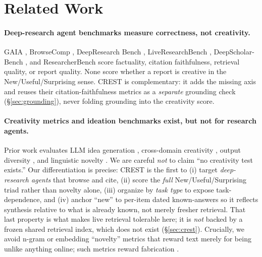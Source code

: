\section{Related Work}
\label{sec:related}

\paragraph{Deep-research agent benchmarks measure correctness, not creativity.}
GAIA \citep{mialon2023gaia}, BrowseComp \citep{wei2025browsecomp}, DeepResearch Bench
\citep{du2025deepresearchbench}, LiveResearchBench \citep{liveresearchbench2025},
DeepScholar-Bench \citep{deepscholarbench2025}, and ResearcherBench \citep{researcherbench2025}
score factuality, citation faithfulness, retrieval quality, or report quality. None score whether
a report is creative in the New/Useful/Surprising sense. CREST is complementary: it adds the
missing axis and reuses their citation-faithfulness metrics as a \emph{separate} grounding
check (\S\ref{sec:grounding}), never folding grounding into the creativity score.

\paragraph{Creativity metrics and ideation benchmarks exist, but not for research agents.}
Prior work evaluates LLM idea generation \citep{si2024novel,ruan2024liveideabench}, cross-domain
creativity \citep{houcreativityprism2025}, output diversity \citep{zhang2025noveltybench}, and
linguistic novelty \citep{lu2024creativityindex}. We are careful \emph{not} to claim ``no
creativity test exists.'' Our differentiation is precise: CREST is the first to (i) target
\emph{deep-research agents} that browse and cite, (ii) score the \emph{full} New/Useful/Surprising
triad rather than novelty alone, (iii) organize by \emph{task type} to expose task-dependence, and
(iv) anchor ``new'' to per-item dated known-answers so it reflects synthesis relative to what is
already known, not merely fresher retrieval. That last property is what makes live retrieval
tolerable here; it is \emph{not} backed by a frozen shared retrieval index, which does not exist
(\S\ref{sec:crest}).
Crucially, we avoid n-gram or embedding ``novelty'' metrics that reward text merely for being
unlike anything online; such metrics reward fabrication \citep{saakyan2026death,lu2024creativityindex}.

